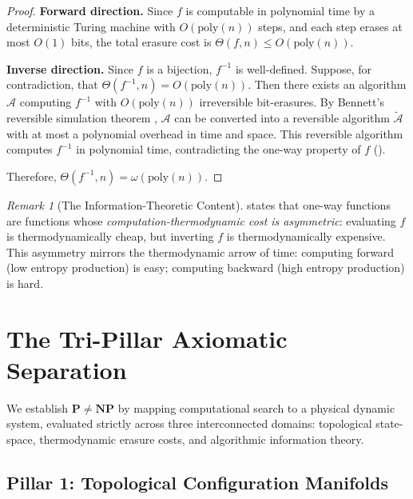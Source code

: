 \documentclass[12pt, a4paper]{article}
\newcommand{\Pc}{\mathbf{P}}
\newcommand{\NPc}{\mathbf{NP}}
\newcommand{\poly}{\text{poly}}
\theoremstyle{plain}
\theoremstyle{definition}
\theoremstyle{remark}
\newtheorem{remark}[theorem]{Remark}
\begin{document}
\begin{proof}
  \textbf{Forward direction.} Since $f$ is computable in polynomial time
  by a deterministic Turing machine with $O(\poly(n))$ steps, and each
  step erases at most $O(1)$ bits, the total erasure cost is
  $\Theta(f, n) \leq O(\poly(n))$.

  \textbf{Inverse direction.} Since $f$ is a bijection, $f^{-1}$ is
  well-defined. Suppose, for contradiction, that $\Theta(f^{-1}, n) = O(\poly(n))$.
  Then there exists an algorithm $\mathcal{A}$ computing $f^{-1}$
  with $O(\poly(n))$ irreversible bit-erasures. By Bennett's
  reversible simulation theorem \citep{Bennett1973}, $\mathcal{A}$ can
  be converted into a reversible algorithm $\widetilde{\mathcal{A}}$ with
  at most a polynomial overhead in time and space. This reversible
  algorithm computes $f^{-1}$ in polynomial time, contradicting the
  one-way property of $f$ ().

  Therefore, $\Theta(f^{-1}, n) = \omega(\poly(n))$.
\end{proof}

\begin{remark}[The Information-Theoretic Content]
   states that one-way functions are functions whose
  \emph{computation-thermodynamic cost is asymmetric}: evaluating $f$ is
  thermodynamically cheap, but inverting $f$ is thermodynamically expensive.
  This asymmetry mirrors the thermodynamic arrow of time: computing forward
  (low entropy production) is easy; computing backward (high entropy production)
  is hard.
\end{remark}

\section{The Tri-Pillar Axiomatic Separation}\label{sec:separation}

We establish $\Pc \neq \NPc$ by mapping computational search to a physical dynamic system, evaluated strictly across three interconnected domains: topological state-space, thermodynamic erasure costs, and algorithmic information theory.

\subsection{Pillar 1: Topological Configuration Manifolds}\label{sec:topology}
\end{document}
